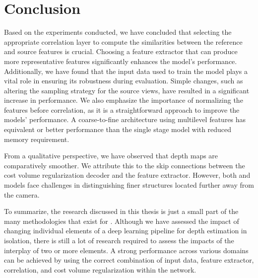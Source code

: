 \section{Conclusion}
Based on the experiments conducted, we have concluded that selecting the appropriate correlation layer to compute the similarities between the reference and source features is crucial. Choosing a feature extractor that can produce more representative features significantly enhances the model's performance. Additionally, we have found that the input data used to train the model plays a vital role in ensuring its robustness during evaluation. Simple changes, such as altering the sampling strategy for the source views, have resulted in a significant increase in performance. We also emphasize the importance of normalizing the features before correlation, as it is a straightforward approach to improve the models' performance. A coarse-to-fine architecture using multilevel features has equivalent or better performance than the single stage model with reduced memory requirement. \par
From a qualitative perspective, we have observed that {\rmvd} depth maps are comparatively smoother. We attribute this to the skip connections between the {\rmvd} cost volume regularization decoder and the feature extractor. However, both {\mvsn} and {\rmvd} models face challenges in distinguishing finer structures located further away from the camera. \par
To summarize, the research discussed in this thesis is just a small part of the many methodologies that exist for {\mvs}. Although we have assessed the impact of changing individual elements of a deep learning {\mvs} pipeline for depth estimation in isolation, there is still a lot of research required to assess the impacts of the interplay of two or more elements. A strong performance across various domains can be achieved by using the correct combination of input data, feature extractor, correlation, and cost volume regularization within the network.
    